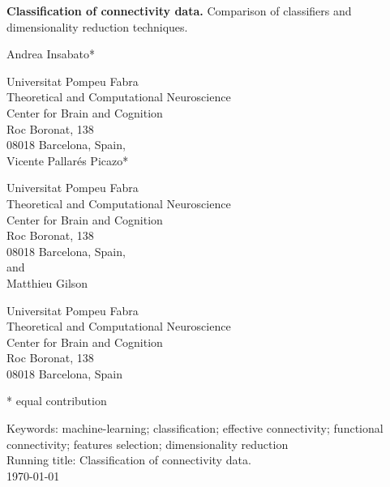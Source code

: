 \documentclass[12pt, a4paper, final, fleqn]{article}
\begin{document}
\begin{center}

\vspace*{2cm}

{ \Large {\bf Classification of connectivity data.} 
Comparison of classifiers and dimensionality reduction techniques.}


\vspace*{2cm}

\large
Andrea Insabato*

\normalsize
{Universitat Pompeu Fabra \\
Theoretical and Computational Neuroscience\\
Center for Brain and Cognition \\
Roc Boronat, 138\\
08018 Barcelona, Spain,} \\[1 cm]

\large
Vicente Pallar\'es Picazo*

\normalsize
{Universitat Pompeu Fabra \\
Theoretical and Computational Neuroscience\\
Center for Brain and Cognition \\
Roc Boronat, 138\\
08018 Barcelona, Spain,} \\[1 cm]

and \\%

\large
Matthieu Gilson

\normalsize
{Universitat Pompeu Fabra \\
Theoretical and Computational Neuroscience\\
Center for Brain and Cognition \\
Roc Boronat, 138\\
08018 Barcelona, Spain} \\
\end{center}

* equal contribution

Keywords:  machine-learning; classification; effective connectivity; functional connectivity; features selection; dimensionality reduction\\
Running title: Classification of connectivity data.\\
\today

\newpage
\doublespacing
\begin{abstract}

\end{abstract}
\end{document}

